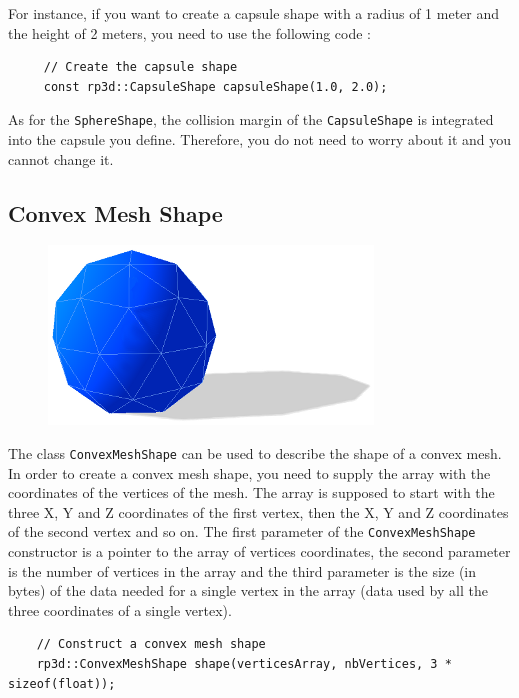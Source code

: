 \documentclass[a4paper,12pt]{article}
\begin{document}
    For instance, if you want to create a capsule shape with a radius of 1 meter and the height of 2 meters, you need to use the following code : \\

    \begin{lstlisting}
     // Create the capsule shape
     const rp3d::CapsuleShape capsuleShape(1.0, 2.0);
  \end{lstlisting}

    \vspace{0.6cm}

    As for the \texttt{SphereShape}, the collision margin of the \texttt{CapsuleShape} is integrated into the capsule you define.
    Therefore, you do not need to worry about it and you cannot change it.

    \subsection{Convex Mesh Shape}

    \begin{figure}[h]
        \centering
        \includegraphics{convexshape.png}
        \label{fig:convexshape}
    \end{figure}

    The class \texttt{ConvexMeshShape} can be used to describe the shape of a convex mesh. In order to create a convex mesh shape, you need to supply the array with the coordinates of
    the vertices of the mesh. The array is supposed to start with the three X, Y and Z coordinates of the first vertex, then the X, Y and Z coordinates of the second vertex and so on.
    The first parameter of the \texttt{ConvexMeshShape} constructor is a pointer to the array of vertices coordinates, the second parameter is the number of vertices in the array and
    the third parameter is the size (in bytes) of the data needed for a single vertex in the array (data used by all the three coordinates of a single vertex).

    \begin{lstlisting}
    // Construct a convex mesh shape
    rp3d::ConvexMeshShape shape(verticesArray, nbVertices, 3 * sizeof(float));
  \end{lstlisting}
\end{document}
